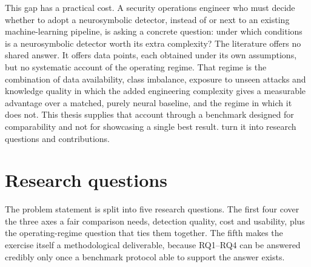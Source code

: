 This gap has a practical cost. A security operations engineer who must
decide whether to adopt a neurosymbolic detector, instead of or next to an
existing machine-learning pipeline, is asking a concrete question: under
which conditions is a neurosymbolic detector worth its extra complexity? The
literature offers no shared answer. It offers data points, each obtained
under its own assumptions, but no systematic account of the operating regime.
That regime is the combination of data availability, class imbalance,
exposure to unseen attacks and knowledge quality in which the added
engineering complexity gives a measurable advantage over a matched, purely
neural baseline, and the regime in which it does not. This thesis supplies
that account through a benchmark designed for comparability and not for
showcasing a single best result. 
turn it into research questions and contributions.

\section{Research questions}
\label{sec:research-questions}

The problem statement is split into five research questions. The first four
cover the three axes a fair comparison needs, detection quality, cost and
usability, plus the operating-regime question that ties them together. The
fifth makes the exercise itself a methodological deliverable, because
RQ1--RQ4 can be answered credibly only once a benchmark protocol able to
support the answer exists.

